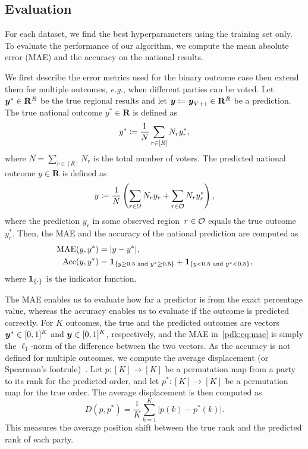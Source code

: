 \subsection{Evaluation}

For each dataset, we find the best hyperparameters using the training set only. %
To evaluate the performance of our algorithm, we compute the mean absolute error (MAE) and the accuracy on the national results.

We first describe the error metrics used for the binary outcome case then extend them for multiple outcomes, \textit{e.g.}, when different parties can be voted.
Let $\mbox{$\mbox{$\boldsymbol{y}$}$}^* \in \mathbf{R}^R$ be the true regional results and let $\mbox{$\mbox{$\boldsymbol{y}$}$} \coloneqq \mbox{$\mbox{$\boldsymbol{y}$}$}_{V+1} \in \mathbf{R}^R$ be a prediction.
The true national outcome $y^* \in \mathbf{R}$ is defined as
\begin{equation*}
	y^* \coloneqq \frac{1}{N} \sum_{r \in [R]} N_r y_r^*,
\end{equation*}
where $N = \sum_{r \in [R]} N_r$ is the total number of voters.
The predicted national outcome $y \in \mathbf{R}$ is defined as
\begin{equation*}
	\label{pdk:eq:prediction}
	y \coloneqq \frac{1}{N}\left( \sum_{r \in \mathcal{U}} N_r y_r + \sum_{r \in \mathcal{O}} N_r y_r^* \right),
\end{equation*}
where the prediction $y_r$ in some observed region~$r \in \mathcal{O}$ equals the true outcome $y_r^*$.
Then, the MAE and the accuracy of the national prediction are computed as
\begin{align}
	\textrm{MAE}(y, y^*)         & = \vert y - y^* \vert, \label{pdk:eq:mae}                                                                                  \\
	\textrm{Acc}(y, y^*) & = \bm{1}_{\left \{ y \geq 0.5 \textrm{ and } y^* \geq 0.5 \right \} } \nonumber + \bm{1}_{\left \{  y < 0.5 \textrm{ and } y^* < 0.5 \right \} }, \label{pdk:eq:acc}
\end{align}
where $\bm{1}_{\left \{ \cdot \right \} }$ is the indicator function.

The MAE enables us to evaluate how far a predictor is from the exact percentage value, whereas the accuracy enables us to evaluate if the outcome is predicted correctly.
For $K$ outcomes, the true and the predicted outcomes are vectors $\mbox{$\mbox{$\boldsymbol{y}$}$}^* \in [0, 1]^K$ and $\mbox{$\mbox{$\boldsymbol{y}$}$} \in [0, 1]^K$, respectively, and the MAE in~\eqref{pdk:eq:mae} is simply the $\ell_1$-norm of the difference between the two vectors.
As the accuracy is not defined for multiple outcomes, we compute the average displacement (or Spearman's footrule)~\cite{diaconis1977spearman}.
Let \mbox{$p: [K] \rightarrow [K]$} be a permutation map from a party to its rank for the predicted order, and let \mbox{$p^*: [K] \rightarrow [K]$} be a permutation map for the true order.
The average displacement is then computed as
\begin{equation*}
	D(p, p^*) = \frac{1}{K} \sum_{k=1}^K \vert p(k) - p^*(k) \vert.
\end{equation*}
This measures the average position shift between the true rank and the predicted rank of each party.

